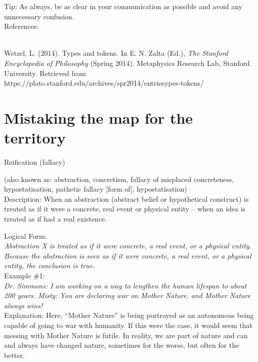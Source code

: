 \documentclass[a4paper,12pt,single,pdftex]{scrbook}
\begin{document}
    
      Tip: As always, be as clear in your communication as possible and avoid any unnecessary confusion.
    \\

    References:

    
      
        
      \\

      
        
          Wetzel, L. (2014). Types and tokens. In E. N. Zalta (Ed.), {\it The Stanford Encyclopedia of Philosophy} (Spring 2014). Metaphysics Research Lab, Stanford University. Retrieved from https://plato.stanford.edu/archives/spr2014/entriesypes-tokens/
        
      
    
  \section{Mistaking the map for the territory}


Reification (fallacy)
    
      (also known as: abstraction, concretism, fallacy of misplaced concreteness, hypostatisation, pathetic fallacy [form of], hypostatisation)
    \\

  
    Description: When an abstraction (abstract belief or hypothetical construct) is treated as if it were a concrete, real event or physical entity -- when an idea is treated as if had a real existence.

    
      Logical Form:
    \\

    
      {\em Abstraction X is treated as if it were concrete, a real event, or a physical entity. \newline
Because the abstraction is seen as if it were concrete, a real event, or a physical entity, the conclusion is true.}
    \\

    
      Example \#1:
    \\

    
      {\em Dr. Simmons: I am working on a way to lengthen the human lifespan to about 200 years. \newline
Misty: You are declaring war on Mother Nature, and Mother Nature always wins!}
    \\

    
      Explanation: Here, “Mother Nature” is being portrayed as an autonomous being capable of going to war with humanity. If this were the case, it would seem that messing with Mother Nature is futile. In reality, we are part of nature and can and always have changed nature, sometimes for the worse, but often for the better.
    \\
\end{document}
